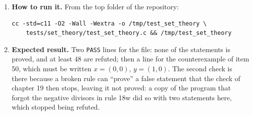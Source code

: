 \documentclass[11pt,a4paper]{article}
\begin{document}
\begin{enumerate}
\item \textbf{How to run it.} From the top folder of the repository:
\begin{verbatim}
cc -std=c11 -O2 -Wall -Wextra -o /tmp/test_set_theory \
    tests/set_theory/test_set_theory.c && /tmp/test_set_theory
\end{verbatim}

\item \textbf{Expected result.} Two \texttt{PASS} lines for the file: none of the statements is proved, and at least 48 are refuted; then a line for the counterexample of item 50, which must be written $x = (0, 0)$, $y = (1, 0)$. The second check is there because a broken rule can ``prove'' a false statement that the check of chapter 19 then stops, leaving it not proved: a copy of the program that forgot the negative divisors in rule 18w did so with two statements here, which stopped being refuted.
\end{enumerate}
\end{document}
